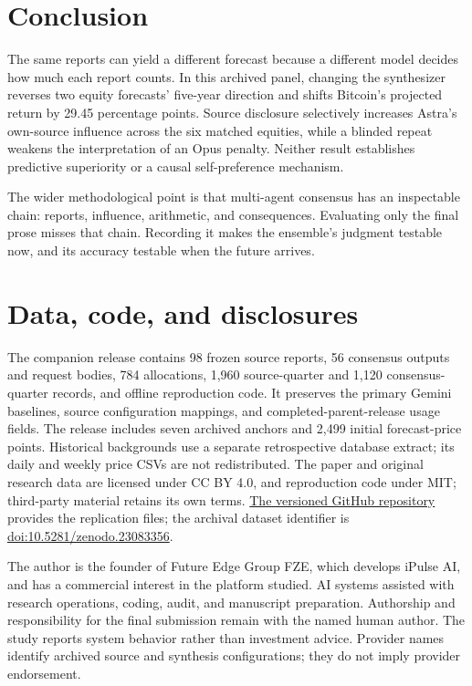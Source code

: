 \documentclass[11pt]{article}
\begin{document}
\section{Conclusion}
The same reports can yield a different forecast because a different model decides how much each report counts. In this archived panel, changing the synthesizer reverses two equity forecasts' five-year direction and shifts Bitcoin's projected return by 29.45 percentage points. Source disclosure selectively increases Astra's own-source influence across the six matched equities, while a blinded repeat weakens the interpretation of an Opus penalty. Neither result establishes predictive superiority or a causal self-preference mechanism.

The wider methodological point is that multi-agent consensus has an inspectable chain: reports, influence, arithmetic, and consequences. Evaluating only the final prose misses that chain. Recording it makes the ensemble's judgment testable now, and its accuracy testable when the future arrives.

\section*{Data, code, and disclosures}
The companion release contains 98 frozen source reports, 56 consensus outputs and request bodies, 784 allocations, 1,960 source-quarter and 1,120 consensus-quarter records, and offline reproduction code. It preserves the primary Gemini baselines, source configuration mappings, and completed-parent-release usage fields. The release includes seven archived anchors and 2,499 initial forecast-price points. Historical backgrounds use a separate retrospective database extract; its daily and weekly price CSVs are not redistributed. The paper and original research data are licensed under CC BY 4.0, and reproduction code under MIT; third-party material retains its own terms. \href{https://github.com/TheFutureEdge/research-when-models-judge-models}{The versioned GitHub repository} provides the replication files; the archival dataset identifier is \href{https://doi.org/10.5281/zenodo.23083356}{doi:10.5281/zenodo.23083356}.

The author is the founder of Future Edge Group FZE, which develops iPulse AI, and has a commercial interest in the platform studied. AI systems assisted with research operations, coding, audit, and manuscript preparation. Authorship and responsibility for the final submission remain with the named human author. The study reports system behavior rather than investment advice. Provider names identify archived source and synthesis configurations; they do not imply provider endorsement.
\end{document}
